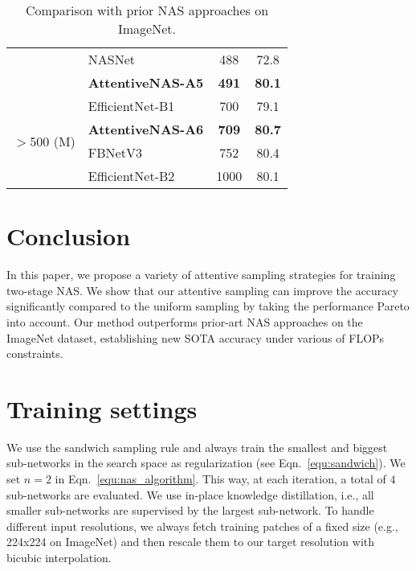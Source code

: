 \documentclass[final]{cvpr}
\theoremstyle{definition}
\begin{document}
\begin{table}[ht]
\begin{tabular}{clcc}
        & NASNet~\citep{zoph2018learning} & 488 & 72.8 \\
        & \textbf{AttentiveNAS-A5}   & \textbf{491} & \textbf{80.1} \\ \hline
         \multirow{4}{5em}{$>$500 (M) } 
         & EfficientNet-B1~\cite{tan2019efficientnet} & 700 & 79.1 \\
         & \textbf{AttentiveNAS-A6}  & \textbf{709} & \textbf{80.7} \\ 
         & FBNetV3~\cite{dai2020fbnetv3} & 752 & {80.4} \\
         & EfficientNet-B2~\cite{tan2019efficientnet} & 1000 & 80.1 \\
         \hline
    \end{tabular}
    \caption{Comparison with prior NAS approaches on ImageNet.} 
    \label{tab:compare_with_sota}
\end{table}

 
\section{Conclusion}
In this paper, we propose a variety of attentive sampling strategies for training two-stage NAS. 
We show that our attentive sampling can improve the accuracy significantly compared to the uniform sampling by taking the performance Pareto into account. Our method outperforms prior-art NAS approaches on the ImageNet dataset, establishing new SOTA accuracy under various of FLOPs constraints.

{\small


}

\newpage
\onecolumn
\appendix

\section{Training settings}
\label{app:training_settings}
We use the sandwich sampling rule and always train the smallest and biggest sub-networks in the search space as regularization (see Eqn.~\eqref{equ:sandwich}). 
We set $n=2$ in Eqn.~\eqref{equ:nas_algorithm}. This way, at each iteration, a total of $4$ sub-networks are evaluated. 
We use in-place knowledge distillation, i.e.,
all smaller sub-networks are supervised by the largest sub-network. 
To handle different input resolutions, 
we always fetch training patches of a fixed size (e.g., 224x224 on ImageNet) and then rescale them to our target resolution with bicubic interpolation.
\end{document}
